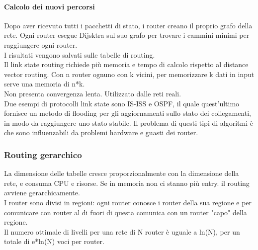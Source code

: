 \documentclass{article}
\begin{document}
\paragraph{Calcolo dei nuovi percorsi}
Dopo aver ricevuto tutti i pacchetti di stato, i router creano il proprio grafo della rete. Ogni router esegue Dijsktra sul suo grafo per trovare i cammini minimi per raggiungere ogni router. \\
I risultati vengono salvati sulle tabelle di routing.\\
Il link state routing richiede più memoria e tempo di calcolo rispetto al distance vector routing. Con n router ognuno con k vicini, per memorizzare k dati in input serve una memoria di n*k.\\
Non presenta convergenza lenta.
Utilizzato dalle reti reali.\\
Due esempi di protocolli link state sono IS-ISS e OSPF, il quale quest'ultimo fornisce un metodo di flooding per gli aggiornamenti sullo stato dei collegamenti, in modo da raggiungere uno stato stabile. 
Il problema di questi tipi di algoritmi è che sono influenzabili da problemi hardware e guasti dei router. 
\subsubsection{Routing gerarchico}
La dimensione delle tabelle cresce proporzionalmente con la dimensione della rete, e consuma CPU e risorse. Se in memoria non ci stanno più entry. il routing avviene gerarchicamente. \\
I router sono divisi in regioni: ogni router conosce i router della sua regione e per comunicare con router al di fuori di questa comunica con un router "capo" della regione.\\
Il numero ottimale di livelli per una rete di N router è uguale a ln(N), per un totale di e*ln(N) voci per router. 
\end{document}
